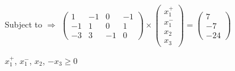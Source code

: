 \documentclass[letterpaper,11pt]{article}
\begin{document}
Subject to $\Rightarrow$
$
    \begin{pmatrix}
        1 & -1 & 0 & -1\\ 
        -1 & 1 & 0 & 1\\
        -3 & 3 & -1 & 0
    \end{pmatrix}
    \times
    \begin{pmatrix}
        x_1^{+}\\
        x_1^{-}\\
        x_2\\
        x_3
    \end{pmatrix}
    =
    \begin{pmatrix}
        7\\ 
        -7\\
        -24
    \end{pmatrix}
$

\tabto{63pt} $x_1^{+}$, $x_1^{-}$, $x_2$, $-x_3 \geq 0$
\end{document}
